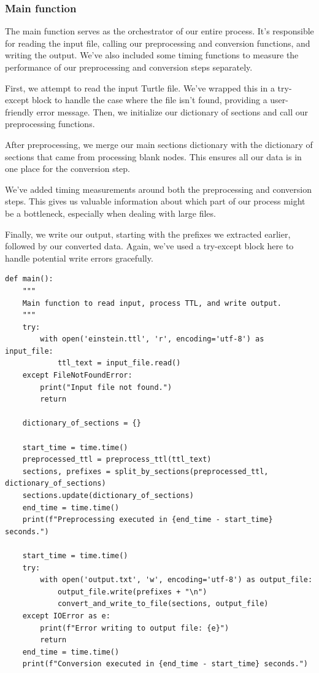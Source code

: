 \subsubsection{Main function}
The main function serves as the orchestrator of our entire process. It's responsible for reading the input file, calling our preprocessing and conversion functions, and writing the output. We've also included some timing functions to measure the performance of our preprocessing and conversion steps separately.

First, we attempt to read the input Turtle file. We've wrapped this in a try-except block to handle the case where the file isn't found, providing a user-friendly error message. Then, we initialize our dictionary of sections and call our preprocessing functions.

After preprocessing, we merge our main sections dictionary with the dictionary of sections that came from processing blank nodes. This ensures all our data is in one place for the conversion step.

We've added timing measurements around both the preprocessing and conversion steps. This gives us valuable information about which part of our process might be a bottleneck, especially when dealing with large files.

Finally, we write our output, starting with the prefixes we extracted earlier, followed by our converted data. Again, we've used a try-except block here to handle potential write errors gracefully.

{\footnotesize
\begin{verbatim}
def main():
    """
    Main function to read input, process TTL, and write output.
    """
    try:
        with open('einstein.ttl', 'r', encoding='utf-8') as input_file:
            ttl_text = input_file.read()
    except FileNotFoundError:
        print("Input file not found.")
        return

    dictionary_of_sections = {}

    start_time = time.time()
    preprocessed_ttl = preprocess_ttl(ttl_text)
    sections, prefixes = split_by_sections(preprocessed_ttl, dictionary_of_sections)
    sections.update(dictionary_of_sections)
    end_time = time.time()
    print(f"Preprocessing executed in {end_time - start_time} seconds.")

    start_time = time.time()
    try:
        with open('output.txt', 'w', encoding='utf-8') as output_file:
            output_file.write(prefixes + "\n")
            convert_and_write_to_file(sections, output_file)
    except IOError as e:
        print(f"Error writing to output file: {e}")
        return
    end_time = time.time()
    print(f"Conversion executed in {end_time - start_time} seconds.")
\end{verbatim}
}

